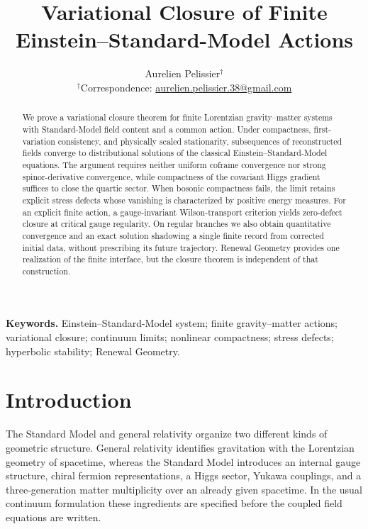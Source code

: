 \documentclass[11pt]{article}
\title{\textbf{Variational Closure of Finite Einstein--Standard-Model Actions}}
\author{Aurelien Pelissier$^{\dagger}$\\
{\small $^{\dagger}$Correspondence: \href{mailto:aurelien.pelissier.38@gmail.com}{aurelien.pelissier.38@gmail.com}}}
\date{}
\numberwithin{equation}{section}
\theoremstyle{definition}
\theoremstyle{remark}
\begin{document}
\maketitle

\begin{abstract}
We prove a variational closure theorem for finite Lorentzian gravity--matter systems with Standard-Model field content and a common action. Under compactness, first-variation consistency, and physically scaled stationarity, subsequences of reconstructed fields converge to distributional solutions of the classical Einstein--Standard-Model equations. The argument requires neither uniform coframe convergence nor strong spinor-derivative convergence, while compactness of the covariant Higgs gradient suffices to close the quartic sector. When bosonic compactness fails, the limit retains explicit stress defects whose vanishing is characterized by positive energy measures. For an explicit finite action, a gauge-invariant Wilson-transport criterion yields zero-defect closure at critical gauge regularity. On regular branches we also obtain quantitative convergence and an exact solution shadowing a single finite record from corrected initial data, without prescribing its future trajectory. Renewal Geometry provides one realization of the finite interface, but the closure theorem is independent of that construction.
\end{abstract}

\medskip
\noindent\textbf{Keywords.} Einstein--Standard-Model system; finite gravity--matter actions; variational closure; continuum limits; nonlinear compactness; stress defects; hyperbolic stability; Renewal Geometry.






\section{Introduction}
\label{sec:intro}

The Standard Model and general relativity organize two different kinds of
geometric structure.  General relativity identifies gravitation with the
Lorentzian geometry of spacetime, whereas the Standard Model introduces an
internal gauge structure, chiral fermion representations, a Higgs sector,
Yukawa couplings, and a three-generation matter multiplicity over an already
given spacetime.  In the usual continuum formulation these ingredients are
specified before the coupled field equations are written.
\end{document}
